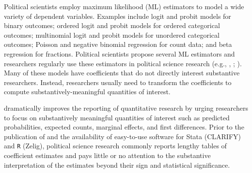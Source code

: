 \documentclass[11pt]{article}
\begin{document}


\thispagestyle{empty}

\onehalfspace



Political scientists employ maximum likelihood (ML) estimators to model a wide variety of dependent variables.
Examples include logit and probit models for binary outcomes; ordered logit and probit models for ordered categorical outcomes; multinomial logit and probit models for unordered categorical outcomes; Poisson and negative binomial regression for count data; and beta regression for fractions.
Political scientists propose several ML estimators and researchers regularly use these estimators in political science research (e.g., \citealt{Nagler1994}, \citealt{KatzKing1999}; \citealt{Mebane2000}).
Many of these models have coefficients that do not directly interest substantive researchers.
Instead, researchers usually need to transform the coefficients to compute substantively-meaningful quantities of interest.


\cite{KingTomzWittenberg2000} dramatically improves the reporting of quantitative research by urging researchers to focus on substantively meaningful quantities of interest such as predicted probabilities, expected counts, marginal effects, and first differences.
Prior to the publication of \cite{KingTomzWittenberg2000} and the availability of easy-to-use software for Stata (CLARIFY) and \texttt{R} (Zelig), political science research commonly reports lengthy tables of coefficient estimates and pays little or no attention to the substantive interpretation of the estimates beyond their sign and statistical significance.
\end{document}

